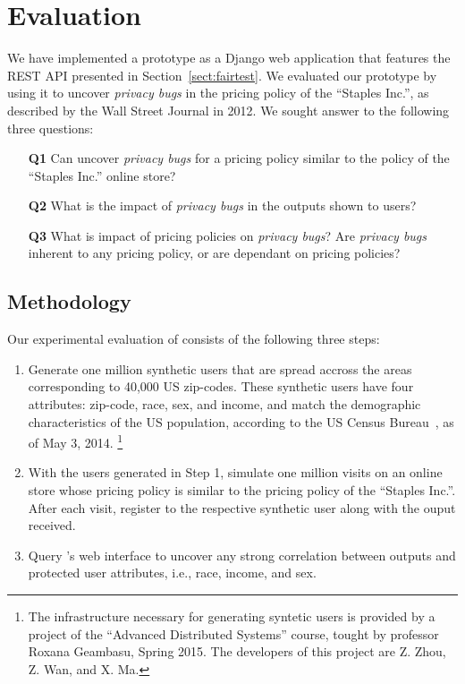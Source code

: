 \section{Evaluation}
\label{sect:evaluation}

We have implemented a \sysname prototype as a Django web application
that features the REST API presented in Section~\ref{sect:fairtest}.
We evaluated our prototype by using it to uncover {\it privacy bugs}
in the pricing policy of the ``Staples Inc.'', as described by the
Wall Street Journal in 2012. We sought answer to the following three
questions:

\begin{enumerate}
  \item[{\bf Q1}] Can \sysname uncover {\em privacy bugs} for
    a pricing policy similar to the policy of the ``Staples Inc.''
    online store?
  \item[{\bf Q2}] What is the impact of {\em privacy bugs} in the outputs
    shown to users?
  \item[{\bf Q3}] What is impact of pricing policies on {\em privacy bugs}?
    Are {\em privacy bugs} inherent to any pricing policy, or are
    dependant on pricing policies?
\end{enumerate}

\subsection{\normalsize Methodology}
Our experimental evaluation of \sysname consists of the following three steps:

\begin{enumerate}
  \item
  Generate one million synthetic users that are spread accross the
  areas corresponding to 40,000 US zip-codes. These synthetic users
  have four attributes: zip-code, race, sex, and income, and match
  the demographic characteristics of the US population, according to
  the US Census Bureau~\cite{CensusBureau}, as of May 3, 2014.
  \footnote{
    The infrastructure necessary for generating syntetic users is
    provided by a project of the ``Advanced Distributed Systems'' course,
    tought by professor Roxana Geambasu, Spring 2015. The developers of this
    project are Z. Zhou, Z. Wan, and X. Ma.
  }

  \item
  With the users generated in Step 1, simulate one million visits on
  an online store whose pricing policy is similar to the pricing policy
  of the ``Staples Inc.''.
  After each visit, register to \sysname the respective synthetic user
  along with the ouput received.

  \item
  Query \sysname's web interface to uncover any strong correlation between
  outputs and protected user attributes, i.e., race, income, and sex.
\end{enumerate}

